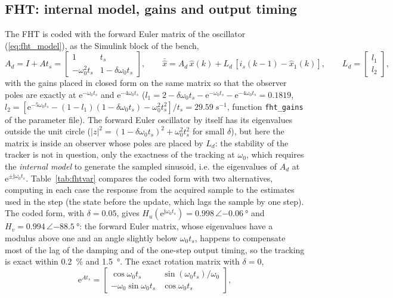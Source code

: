 \documentclass[10pt,a4paper]{scrartcl}
\newcommand{\ts}{t_s}
\newcommand{\wo}{\omega_0}
\newcommand{\jj}{\mathrm{j}}
\newcommand{\ee}{\mathrm{e}}
\newcommand{\code}[1]{\texttt{#1}}
\newcommand{\Hu}{H_u}
\newcommand{\Hv}{H_v}
\begin{document}
\begin{onehalfspace}
\subsection{FHT: internal model, gains and output timing}
\label{sec:disc_fht}

The FHT is coded with the forward Euler matrix of the oscillator (\ref{eq:fht_model}), as the Simulink block of the bench,
\begin{equation}
A_d = I + A\ts = \begin{bmatrix} 1 & \ts \\ -\wo^2\ts & 1 - \delta\wo\ts \end{bmatrix}, \qquad
\bar{\hat x} = A_d\,\hat x(k) + L_d\,[i_s(k-1) - \hat x_1(k)], \qquad L_d = \begin{bmatrix} l_1 \\ l_2 \end{bmatrix},
\label{eq:fht_code}
\end{equation}
with the gains placed in closed form on the same matrix so that the observer poles are exactly at $\ee^{-\wo\ts}$ and $\ee^{-4\wo\ts}$ ($l_1 = 2 - \delta\wo\ts - \ee^{-\wo\ts} - \ee^{-4\wo\ts} = 0.1819$, $l_2 = [\ee^{-5\wo\ts} - (1 - l_1)(1 - \delta\wo\ts) - \wo^2\ts^2]/\ts = \SI{29.59}{s^{-1}}$, function \code{fht\_gains} of the parameter file). The forward Euler oscillator by itself has its eigenvalues outside the unit circle ($|z|^2 = (1 - \delta\wo\ts)^2 + \wo^2\ts^2$ for small $\delta$), but here the matrix is inside an observer whose poles are placed by $L_d$: the stability of the tracker is not in question, only the exactness of the tracking at $\wo$, which requires the \emph{internal model} to generate the sampled sinusoid, i.e. the eigenvalues of $A_d$ at $\ee^{\pm\jj\wo\ts}$. Table~\ref{tab:fhtvar} compares the coded form with two alternatives, computing in each case the response from the acquired sample to the estimates used in the step (the state before the update, which lags the sample by one step). The coded form, with $\delta = 0.05$, gives $\Hu(\ee^{\jj\wo\ts}) = 0.998\,\angle\SI{-0.06}{\degree}$ and $\Hv = 0.994\,\angle\SI{-88.5}{\degree}$: the forward Euler matrix, whose eigenvalues have a modulus above one and an angle slightly below $\wo\ts$, happens to compensate most of the lag of the damping and of the one-step output timing, so the tracking is exact within \SI{0.2}{\percent} and \SI{1.5}{\degree}. The exact rotation matrix with $\delta = 0$,
\begin{equation}
\ee^{A\ts} = \begin{bmatrix} \cos\wo\ts & \sin(\wo\ts)/\wo \\ -\wo\sin\wo\ts & \cos\wo\ts \end{bmatrix},

\end{equation}
\end{onehalfspace}
\end{document}
